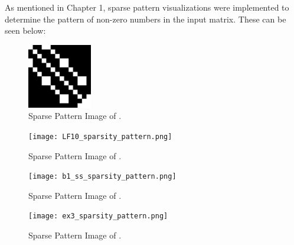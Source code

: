 \documentclass[12pt]{article}
\begin{document}
As mentioned in Chapter 1, sparse pattern visualizations were implemented to determine the pattern of non-zero numbers in the input matrix. These can be seen below:

\begin{figure}[h]
  \centering
  \includegraphics[width=0.25\textwidth]{LFAT5_sparsity_pattern.png}
  \caption{Sparse Pattern Image of .}
  \label{fig:your_image}
\end{figure}

\begin{figure}[h]
  \centering
  \texttt{[image: LF10\_sparsity\_pattern.png]}
  \caption{Sparse Pattern Image of .}
  \label{fig:your_image}
\end{figure}

\begin{figure}[h]
  \centering
  \texttt{[image: b1\_ss\_sparsity\_pattern.png]}
  \caption{Sparse Pattern Image of .}
  \label{fig:your_image}
\end{figure}

\begin{figure}[h]
  \centering
  \texttt{[image: ex3\_sparsity\_pattern.png]}
  \caption{Sparse Pattern Image of .}
  \label{fig:your_image}
\end{figure}
\end{document}
